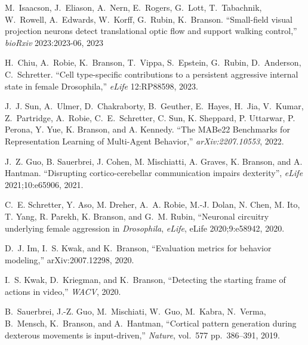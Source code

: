 \begin{cvenum}

\item M.~Isaacson, J.~Eliason, A.~Nern, E.~Rogers, G.~Lott, T.~Tabachnik, W.~Rowell, A.~Edwards, W.~Korff, G.~Rubin, K.~Branson. ``Small-field visual projection neurons detect translational optic flow and support walking control,'' {\em bioRxiv} 2023:2023-06, 2023

\item H.~Chiu, A.~Robie, K.~Branson, T.~Vippa, S.~Epstein, G.~Rubin, D.~Anderson, C.~Schretter. ``Cell type-specific contributions to a persistent aggressive internal state in female Drosophila,'' {\em eLife} 12:RP88598, 2023. 

\item J.~J. Sun, A.~Ulmer, D.~Chakraborty, B.~Geuther, E.~Hayes, H.~Jia, V.~Kumar, Z.~Partridge, A.~Robie, C.~E.~Schretter,  C. Sun, K. Sheppard, P. Uttarwar, P. Perona, Y. Yue, K. Branson, and A. Kennedy. ``The MABe22 Benchmarks for Representation Learning of Multi-Agent Behavior,'' {\em arXiv:2207.10553}, 2022. 

\item J.~Z. Guo, B. Sauerbrei, J. Cohen, M. Mischiatti, A. Graves, K. Branson, and A. Hantman. ``Disrupting cortico-cerebellar communication impairs dexterity'', {\em eLife} 2021;10:e65906, 2021.
  
\item C.~E. Schretter, Y. Aso, M. Dreher, A.~A. Robie, M.-J. Dolan, N. Chen, M. Ito, T. Yang, R. Parekh, K. Branson, and G.~M. Rubin, ``Neuronal circuitry underlying female aggression in {\em {{D}}rosophila}, {\em eLife}, eLife 2020;9:e58942, 2020.
  
\item D.~J. Im, I.~S. Kwak, and K.~Branson, ``Evaluation metrics for behavior modeling,'' arXiv:2007.12298, 2020.
  
\item I.~S. Kwak, D.~Kriegman, and K.~Branson, ``Detecting the starting frame of actions in video,'' {\em WACV}, 2020.

\item B.~Sauerbrei, J.-Z. Guo, M.~Mischiati, W.~Guo, M.~Kabra, N.~Verma, B.~Mensch, K.~Branson, and A.~Hantman, ``Cortical pattern generation during dexterous movements is input-driven,'' {\em Nature}, vol.~577 pp.~386--391, 2019.


\end{cvenum}
